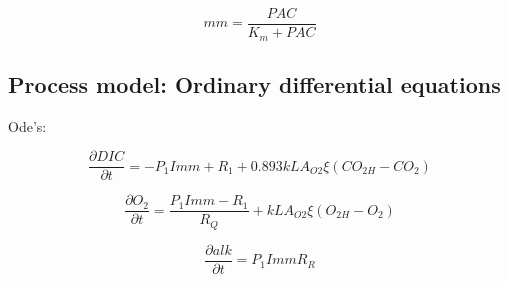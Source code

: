 \documentclass{ruthesis}
\begin{document}
\begin{equation}
mm = \frac{PAC}{K_m + PAC} 
\end{equation}

\subsection{Process model: Ordinary differential equations}

Ode's:

\begin{equation}
\frac{\partial DIC}{\partial t}= - P_1 I mm + R_1 + 0.893 kLA_{O2} \xi (CO_{2H} - CO_{2})
\end{equation}


\begin{equation}
\frac{\partial O_2}{\partial t}= \frac{P_1 I mm - R_1}{R_Q} +  kLA_{O2} \xi (O_{2H} - O_{2})
\end{equation}

\begin{equation}
\frac{\partial alk}{\partial t}=  P_1 I mm R_R
\end{equation}
\end{document}
